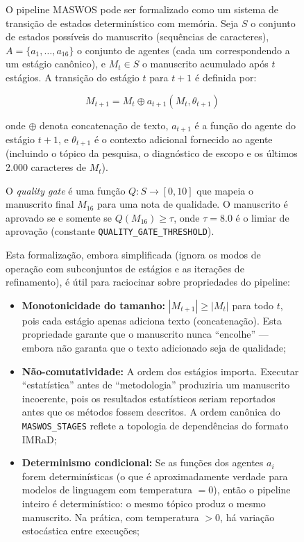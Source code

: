 \begin{figure}
O pipeline MASWOS pode ser formalizado como um sistema de
transição de estados determinístico com memória. Seja $S$ o
conjunto de estados possíveis do manuscrito (sequências de
caracteres), $A = \{a_1, \dots, a_{16}\}$ o conjunto de agentes
(cada um correspondendo a um estágio canônico), e $M_t \in S$ o
manuscrito acumulado após $t$ estágios. A transição do estágio
$t$ para $t+1$ é definida por:

\begin{equation}
M_{t+1} = M_t \oplus a_{t+1}(M_t, \theta_{t+1})
\label{eq:transicao}
\end{equation}

onde $\oplus$ denota concatenação de texto, $a_{t+1}$ é a função
do agente do estágio $t+1$, e $\theta_{t+1}$ é o contexto
adicional fornecido ao agente (incluindo o tópico da pesquisa, o
diagnóstico de escopo e os últimos 2.000 caracteres de $M_t$).

O \textit{quality gate} é uma função $Q: S \to [0, 10]$ que mapeia
o manuscrito final $M_{16}$ para uma nota de qualidade. O
manuscrito é aprovado se e somente se $Q(M_{16}) \geq \tau$, onde
$\tau = 8.0$ é o limiar de aprovação (constante
\texttt{QUALITY\_GATE\_THRESHOLD}).

Esta formalização, embora simplificada (ignora os modos de
operação com subconjuntos de estágios e as iterações de
refinamento), é útil para raciocinar sobre propriedades do
pipeline:

\begin{itemize}
    \item \textbf{Monotonicidade do tamanho:} $|M_{t+1}| \geq |M_t|$
    para todo $t$, pois cada estágio apenas adiciona texto
    (concatenação). Esta propriedade garante que o manuscrito
    nunca ``encolhe'' — embora não garanta que o texto adicionado
    seja de qualidade;

    \item \textbf{Não-comutatividade:} A ordem dos estágios importa.
    Executar ``estatística'' antes de ``metodologia'' produziria um
    manuscrito incoerente, pois os resultados estatísticos seriam
    reportados antes que os métodos fossem descritos. A ordem
    canônica do \texttt{MASWOS\_STAGES} reflete a topologia de
    dependências do formato IMRaD;

    \item \textbf{Determinismo condicional:} Se as funções dos
    agentes $a_i$ forem determinísticas (o que é aproximadamente
    verdade para modelos de linguagem com temperatura $= 0$), então
    o pipeline inteiro é determinístico: o mesmo tópico produz o
    mesmo manuscrito. Na prática, com temperatura $> 0$, há
    variação estocástica entre execuções;


\end{itemize}
\end{figure}
